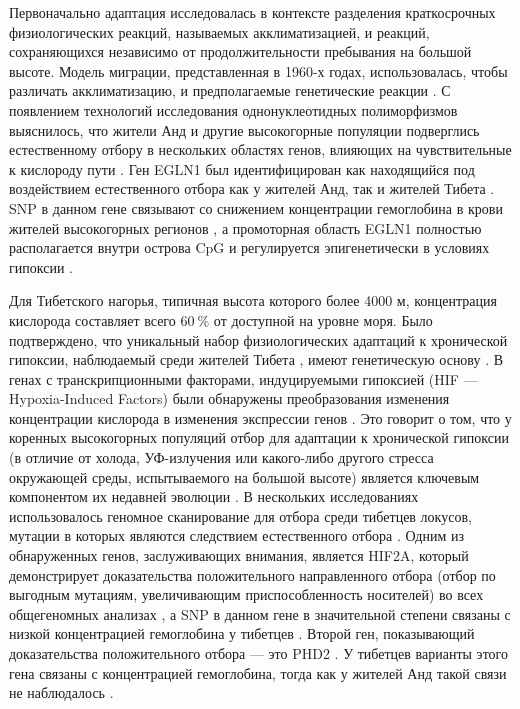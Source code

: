 Первоначально адаптация исследовалась в контексте разделения краткосрочных физиологических реакций, называемых акклиматизацией, и реакций, сохраняющихся независимо от продолжительности пребывания на большой высоте. Модель миграции, представленная в 1960-х годах, использовалась, чтобы различать акклиматизацию, и предполагаемые генетические реакции \autocite{Frisancho1970, Frisancho1995, Frisancho2009}. С появлением технологий исследования однонуклеотидных полиморфизмов выяснилось, что жители Анд и другие высокогорные популяции подверглись естественному отбору в нескольких областях генов, влияющих на чувствительные к кислороду пути \autocite{Moore2017}. Ген EGLN1 был идентифицирован как находящийся под воздействием естественного отбора как у жителей Анд, так и жителей Тибета \autocite{Bigham2009}. SNP в данном гене связывают со снижением концентрации гемоглобина в крови жителей высокогорных регионов \autocite{Beall2010}, а промоторная область EGLN1 полностью располагается внутри острова CpG и регулируется эпигенетически в условиях гипоксии \autocite{Lachance2014}.

Для Тибетского нагорья, типичная высота которого более 4000 м, концентрация кислорода составляет всего $60~\%$ от доступной на уровне моря. Было подтверждено, что уникальный набор физиологических адаптаций к хронической гипоксии, наблюдаемый среди жителей Тибета \autocite{hornbein2001high}, имеют генетическую основу \autocite{Simonson2011, Scheinfeldt2013}. В генах с транскрипционными факторами, индуцируемыми гипоксией (HIF --- Hypoxia-Induced Factors) были обнаружены преобразования изменения концентрации кислорода в изменения экспрессии генов \autocite{Kaelin2008, Lendahl2009, Semenza2012}. Это говорит о том, что у коренных высокогорных популяций отбор для адаптации к хронической гипоксии (в отличие от холода, УФ-излучения или какого-либо другого стресса окружающей среды, испытываемого на большой высоте) является ключевым компонентом их недавней эволюции \autocite{Bigham2014}. В нескольких исследованиях использовалось геномное сканирование для отбора среди тибетцев локусов, мутации в которых являются следствием естественного отбора \autocite{Bigham2009, Simonson2010, Yi2010, Wang2011, Xu2010}. Одним из обнаруженных генов, заслуживающих внимания, является HIF2A, который демонстрирует доказательства положительного направленного отбора (отбор по выгодным мутациям, увеличивающим приспособленность носителей) во всех общегеномных анализах \autocite{Bigham2009, Simonson2010, Yi2010, Wang2011, Xu2010}, а SNP в данном гене в значительной степени связаны с низкой концентрацией гемоглобина у тибетцев \autocite{Yi2010}. Второй ген, показывающий доказательства положительного отбора --- это PHD2 \autocite{Simonson2010, Yi2010, Wang2011, Xu2010}. У тибетцев варианты этого гена связаны с концентрацией гемоглобина, тогда как у жителей Анд такой связи не наблюдалось \autocite{Bigham2009, Simonson2010}. 

